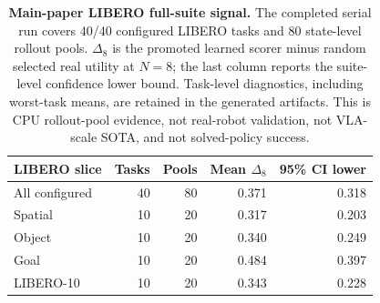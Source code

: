 \begin{table}[t]
\centering
\small
\begin{tabular}{lrrrr}
\toprule
LIBERO slice & Tasks & Pools & Mean $\Delta_{8}$ & 95\% CI lower \\
\midrule
All configured & 40 & 80 & 0.371 & 0.318 \\
Spatial & 10 & 20 & 0.317 & 0.203 \\
Object & 10 & 20 & 0.340 & 0.249 \\
Goal & 10 & 20 & 0.484 & 0.397 \\
LIBERO-10 & 10 & 20 & 0.343 & 0.228 \\
\bottomrule
\end{tabular}
\caption{\textbf{Main-paper LIBERO full-suite signal.} The completed serial run covers 40/40 configured LIBERO tasks and 80 state-level rollout pools. $\Delta_{8}$ is the promoted learned scorer minus random selected real utility at $N=8$; the last column reports the suite-level confidence lower bound. Task-level diagnostics, including worst-task means, are retained in the generated artifacts. This is CPU rollout-pool evidence, not real-robot validation, not VLA-scale SOTA, and not solved-policy success.}
\label{tab:libero-main-suite}
\end{table}
